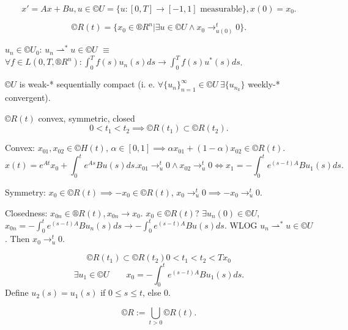 \documentclass[12pt]{article}					%
\begin{document}
\begin{poznamka}
	$$ x' = Ax + Bu, u \in ©U = \{u: [0, T] \rightarrow [-1, 1] \text{ measurable}\}, x(0) = x_0. $$
\end{poznamka}

\begin{definice}
	$$ ©R(t) = \{x_0 \in ®R^n | \exists u \in ©U \land x_0 \rightarrow_{u(0)}^t 0\}. $$
\end{definice}

\begin{definice}
	$u_n \in ©U_0$: $u_n \rightharpoonup^* u \in ©U$ $≡$ $\forall f \in L(0, T, ®R^n): \int_0^T f(s) u_n(s) ds \rightarrow \int_0^T f(s) u^*(s) ds$.
\end{definice}

\begin{veta}[Alaoglu]
	$©U$ is weak-* sequentially compact (i. e. $\forall \{u_n\}_{n=1}^∞ \in ©U\ \exists \{u_{n_k}\}$ weekly-* convergent).
\end{veta}

\begin{veta}
	$©R(t)$ convex, symmetric, closed
	$$ 0 < t_1 < t_2 \implies ©R(t_1) \subset ©R(t_2). $$

	\begin{dukazin}
		Convex: $x_{01}, x_{02} \in ©H(t)$, $\alpha \in [0, 1] \implies \alpha x_{01} + (1 - \alpha)x_{02} \in ©R(t)$.
		$$ x(t) = e^{At} x_0 + \int_0^t e^{As} B u(s) ds. x_{01} \rightarrow_u^t 0 \land x_{02} \rightarrow_u^t 0 \Leftrightarrow x_1 = -\int_0^t e^{(s - t)A} Bu_1(s) ds. $$
		
		Symmetry: $x_0 \in ©R(t) \implies -x_0 \in ©R(t)$, $x_0 \rightarrow_u^t 0 \implies -x_0 \rightarrow_u^t 0$.

		Closedness: $x_{0n} \in ®R(t), x_{0n} \rightarrow x_0$. $x_0 \in ©R(t)$? $\exists u_n(0) \in ©U$, $x_{0n} = - \int_0^t e^{(s - t)A} B u_n(s) ds \rightarrow - \int_0^t e^{(s - t)A} Bu(s) ds$.
		WLOG $u_n \rightharpoonup^* u \in ©U$. Then $x_0 \rightarrow_u^t 0$.

		$$ ©R(t_1) \subset ©R(t_2) 0 < t_1 < t_2 < Tx_0 $$
		$$ \exists u_1 \in ©U\qquad x_0 = -\int_0^t e^{(s - t)A} Bu_1(s) ds. $$
		Define $u_2(s) = u_1(s)$ if $0 ≤ s ≤ t$, else 0.
	\end{dukazin}
\end{veta}

\begin{definice}
	$$ ©R := \bigcup_{t > 0} ©R(t). $$
\end{definice}
\end{document}
